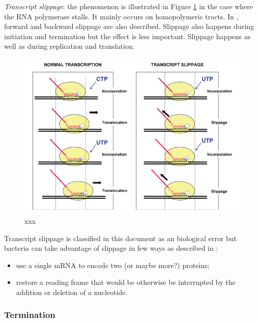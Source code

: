 \emph{Transcript slippage}: the phenomenon is illustrated in Figure \ref{fig:slippage} in the case where the RNA polymerase stalls. It mainly occurs on homopolymeric tracts. In \cite{AMT:10}, forward and backward slippage are also described. Slippage also happens during initiation and termination but the effect is less important. Slippage happens as well as during replication and translation.
\begin{figure}[!ht]
	\centering
	\includegraphics[width=0.8\linewidth]{figure/transcriptSlippage}
	\caption{xxx}
	\label{fig:slippage}
\end{figure}
Transcript slippage is classified in this document as an biological error but bacteria can take advantage of slippage in few ways as described in \cite{ATM:10}:
\begin{itemize}
  \item use a single mRNA to encode two (or maybe more?) proteins;
  \item restore a reading frame that would be otherwise be interrupted by the addition or deletion of a nucleotide.
\end{itemize}


\subsubsection{Termination}
